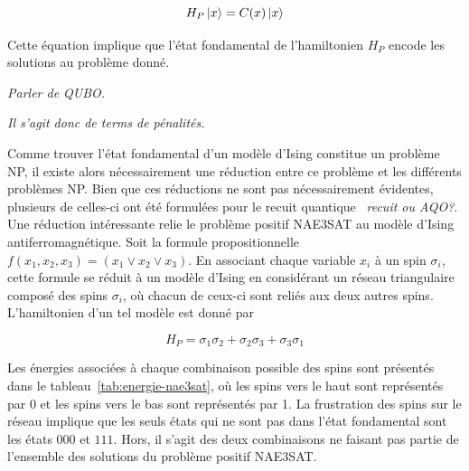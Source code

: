 \begin{equation}
    H_{P} \ket{x} = C(x) \ket{x}
\end{equation}

Cette équation implique que l'état fondamental de l'hamiltonien $H_{P}$ encode les solutions au problème donné. 

\textcolor{mydarkred}{\textit{Parler de QUBO.}}

\textcolor{mydarkred}{\textit{Il s'agit donc de terms de pénalités.}}


Comme trouver l'état fondamental d'un modèle d'Ising constitue un problème NP, il existe alors nécessairement une réduction entre ce problème et les différents problèmes NP. Bien que ces réductions ne sont pas nécessairement évidentes, plusieurs de celles-ci ont été formulées pour le recuit quantique~\cite{lucasIsingFormulationsMany2014,lodewijksMappingNPhardNPcomplete2020} \textcolor{mydarkred}{\textit{recuit ou AQO?}}. Une réduction intéressante relie le problème positif NAE3SAT au modèle d'Ising antiferromagnétique. Soit la formule propositionnelle $f(x_{1}, x_{2}, x_{3}) = (x_{1} \lor x_{2} \lor x_{3})$. En associant chaque variable $x_{i}$ à un spin $\sigma_{i}$, cette formule se réduit à un modèle d'Ising en considérant un réseau triangulaire composé des spins $\sigma_{i}$, où chacun de ceux-ci sont reliés aux deux autres spins. L'hamiltonien d'un tel modèle est donné par

\begin{equation}
    H_{P} = \sigma_{1}\sigma_{2} + \sigma_{2}\sigma_{3} + \sigma_{3}\sigma_{1}
\end{equation}

Les énergies associées à chaque combinaison possible des spins sont présentés dans le tableau~\ref{tab:energie-nae3sat}, où les spins vers le haut sont représentés par 0 et les spins vers le bas sont représentés par 1. La frustration des spins sur le réseau implique que les seuls états qui ne sont pas dans l'état fondamental sont les états $000$ et $111$. Hors, il s'agit des deux combinaisons ne faisant pas partie de l'ensemble des solutions du problème positif NAE3SAT.


